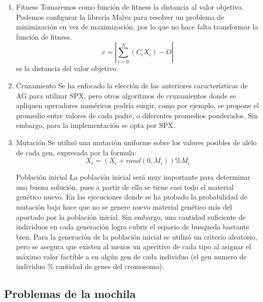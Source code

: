 \documentclass[9pt,conference]{IEEEtran}
\begin{document}
\begin{enumerate}
	\item Fitness
		Tomaremos como funci\'on de fitness la distancia al valor objetivo.
		Podemos configurar la librer\'ia Malva para resolver un problema de minimizaci\'on en vez de maximizaci\'on, por lo que no hace falta transformar la funci\'on de fitness.
		\[ v = |\sum\limits_{i=0}^{N} (C_i X_i) - O| \]
		es la distancia del valor objetivo.

	\item Cruzamiento
		Se ha enfocado la elecci\'on de las anteriores caracter\'izticas de AG para utilizar SPX, pero otros algoritmos de cruzamientos donde se apliquen operadores num\'ericos podr\'ia surgir, como por ejemplo, se propone el promedio entre valores de cada padre, o diferentes promedios ponderados. Sin embargo, para la implementaci\'on se opta por SPX.

	\item Mutaci\'on
		Se utiliz\'o una mutaci\'on uniforme sobre los valores posibles de alelo de cada gen, expresada por la formula:
		\[ X_i = (X_i + rand(0,M_i)) \% M_i \]


	Poblaci\'on inicial
		La poblaci\'on inicial ser\'a muy importante para determinar una buena soluci\'on, pues a partir de ella se tiene casi todo el material gen\'etico nuevo. En las ejecuciones donde se ha probado la probabilidad de mutaci\'on baja hace que no se genere nuevo material gen\'etico m\'as del aportado por la poblaci\'on inicial. Sin embargo, una cantidad suficiente de individuos en cada generaci\'on logra cubrir el espacio de busqueda bastante bien. Para la generaci\'on de la poblaci\'on inicial se utiliz\'o un criterio aleatorio, pero se asegura que existen al menos un aperitivo de cada tipo al asignar el m\'aximo valor factible a en alg\'un gen de cada individuo (el gen numero de individuo \% cantidad de genes del cromosoma).
	\end{enumerate}

	\subsection{Problemas de la mochila}
\end{document}
